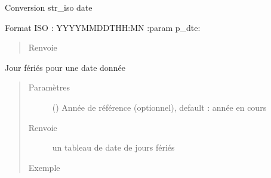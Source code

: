 \documentclass[letterpaper,10pt,french]{sphinxmanual}
\begin{document}
\begin{fulllineitems}
\label{\detokenize{modules/dtemng:toolbox.dtemng.isotodate}}
Conversion str\_iso \sphinxhyphen{} date

Format ISO : YYYY\sphinxhyphen{}MM\sphinxhyphen{}DDTHH:MN
:param p\_dte:
\begin{quote}\begin{description}
\item[{Renvoie}] \leavevmode


\end{description}\end{quote}

\end{fulllineitems}


\begin{fulllineitems}
\label{\detokenize{modules/dtemng:toolbox.dtemng.jours_feries}}
Jour fériés pour une date donnée
\begin{quote}\begin{description}
\item[{Paramètres}] \leavevmode
{} () \textendash{} Année de référence (optionnel), default : année en cours

\item[{Renvoie}] \leavevmode
un tableau de date de jours fériés

\item[{Exemple}] \leavevmode
\begin{sphinxVerbatim}[commandchars=\\\{\}]
              
  
\end{sphinxVerbatim}

\end{description}\end{quote}

\end{fulllineitems}
\end{document}
